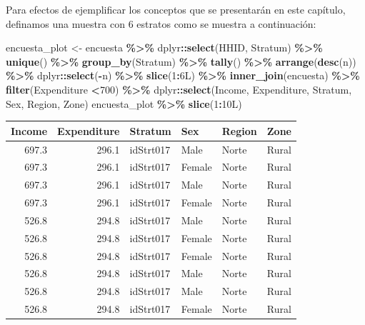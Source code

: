 \documentclass[
  spanish,
  12pt,
]{book}
\newenvironment{Shaded}{\begin{snugshade}}{\end{snugshade}}
\newcommand{\DataTypeTok}[1]{\textcolor[rgb]{0.13,0.29,0.53}{#1}}
\newcommand{\DecValTok}[1]{\textcolor[rgb]{0.00,0.00,0.81}{#1}}
\newcommand{\FunctionTok}[1]{\textcolor[rgb]{0.13,0.29,0.53}{\textbf{#1}}}
\newcommand{\NormalTok}[1]{#1}
\newcommand{\OtherTok}[1]{\textcolor[rgb]{0.56,0.35,0.01}{#1}}
\newcommand{\SpecialCharTok}[1]{\textcolor[rgb]{0.81,0.36,0.00}{\textbf{#1}}}
\begin{document}
Para efectos de ejemplificar los conceptos que se presentarán en este capítulo, definamos una muestra con 6 estratos como se muestra a continuación:

\begin{Shaded}
\begin{Highlighting}[]
\NormalTok{encuesta\_plot }\OtherTok{\textless{}{-}}\NormalTok{ encuesta }\SpecialCharTok{\%\textgreater{}\%}
\NormalTok{  dplyr}\SpecialCharTok{::}\FunctionTok{select}\NormalTok{(HHID, Stratum) }\SpecialCharTok{\%\textgreater{}\%} \FunctionTok{unique}\NormalTok{() }\SpecialCharTok{\%\textgreater{}\%}
  \FunctionTok{group\_by}\NormalTok{(Stratum)  }\SpecialCharTok{\%\textgreater{}\%} \FunctionTok{tally}\NormalTok{() }\SpecialCharTok{\%\textgreater{}\%} 
  \FunctionTok{arrange}\NormalTok{(}\FunctionTok{desc}\NormalTok{(n)) }\SpecialCharTok{\%\textgreater{}\%}\NormalTok{ dplyr}\SpecialCharTok{::}\FunctionTok{select}\NormalTok{(}\SpecialCharTok{{-}}\NormalTok{n) }\SpecialCharTok{\%\textgreater{}\%} 
  \FunctionTok{slice}\NormalTok{(}\DecValTok{1}\SpecialCharTok{:}\DecValTok{6}\DataTypeTok{L}\NormalTok{) }\SpecialCharTok{\%\textgreater{}\%}
  \FunctionTok{inner\_join}\NormalTok{(encuesta) }\SpecialCharTok{\%\textgreater{}\%} \FunctionTok{filter}\NormalTok{(Expenditure }\SpecialCharTok{\textless{}}\DecValTok{700}\NormalTok{) }\SpecialCharTok{\%\textgreater{}\%} 
\NormalTok{  dplyr}\SpecialCharTok{::}\FunctionTok{select}\NormalTok{(Income, Expenditure, Stratum, }
\NormalTok{         Sex, Region, Zone) }
\NormalTok{encuesta\_plot  }\SpecialCharTok{\%\textgreater{}\%} \FunctionTok{slice}\NormalTok{(}\DecValTok{1}\SpecialCharTok{:}\DecValTok{10}\DataTypeTok{L}\NormalTok{)}
\end{Highlighting}
\end{Shaded}

\begin{tabular}{r|r|l|l|l|l}
\hline
Income & Expenditure & Stratum & Sex & Region & Zone\\
\hline
697.3 & 296.1 & idStrt017 & Male & Norte & Rural\\
\hline
697.3 & 296.1 & idStrt017 & Female & Norte & Rural\\
\hline
697.3 & 296.1 & idStrt017 & Male & Norte & Rural\\
\hline
697.3 & 296.1 & idStrt017 & Female & Norte & Rural\\
\hline
526.8 & 294.8 & idStrt017 & Male & Norte & Rural\\
\hline
526.8 & 294.8 & idStrt017 & Female & Norte & Rural\\
\hline
526.8 & 294.8 & idStrt017 & Female & Norte & Rural\\
\hline
526.8 & 294.8 & idStrt017 & Male & Norte & Rural\\
\hline
526.8 & 294.8 & idStrt017 & Male & Norte & Rural\\
\hline
526.8 & 294.8 & idStrt017 & Female & Norte & Rural\\
\hline
\end{tabular}
\end{document}
